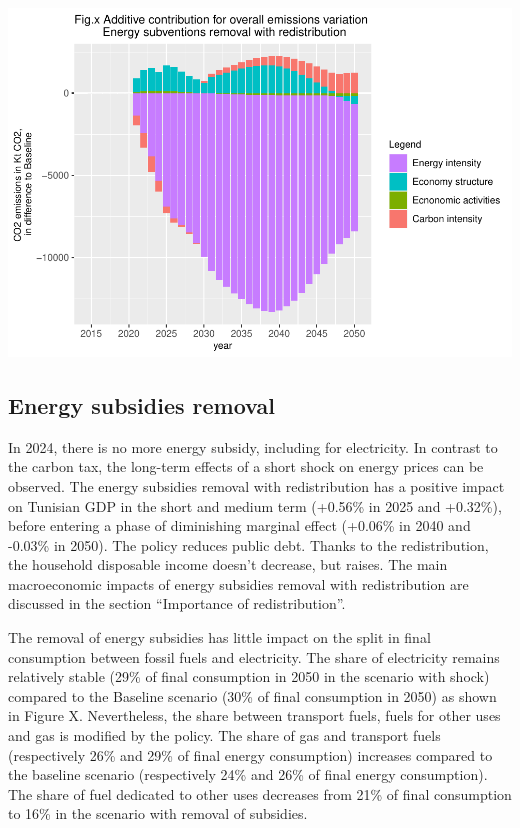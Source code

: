 \documentclass[
]{article}
\begin{document}
\begin{center}\includegraphics[width=0.7\linewidth,height=0.7\textheight]{Modele-ThreeMe-Tunisie_Sequeira_Valilou_Wang_files/figure-latex/unnamed-chunk-28-1} \end{center}

\hypertarget{energy-subsidies-removal}{%
\subsection{Energy subsidies removal}\label{energy-subsidies-removal}}

In 2024, there is no more energy subsidy, including for electricity. In
contrast to the carbon tax, the long-term effects of a short shock on
energy prices can be observed. The energy subsidies removal with
redistribution has a positive impact on Tunisian GDP in the short and
medium term (+0.56\% in 2025 and +0.32\%), before entering a phase of
diminishing marginal effect (+0.06\% in 2040 and -0.03\% in 2050). The
policy reduces public debt. Thanks to the redistribution, the household
disposable income doesn't decrease, but raises. The main macroeconomic
impacts of energy subsidies removal with redistribution are discussed in
the section ``Importance of redistribution''.

The removal of energy subsidies has little impact on the split in final
consumption between fossil fuels and electricity. The share of
electricity remains relatively stable (29\% of final consumption in 2050
in the scenario with shock) compared to the Baseline scenario (30\% of
final consumption in 2050) as shown in Figure X. Nevertheless, the share
between transport fuels, fuels for other uses and gas is modified by the
policy. The share of gas and transport fuels (respectively 26\% and 29\%
of final energy consumption) increases compared to the baseline scenario
(respectively 24\% and 26\% of final energy consumption). The share of
fuel dedicated to other uses decreases from 21\% of final consumption to
16\% in the scenario with removal of subsidies.
\end{document}
